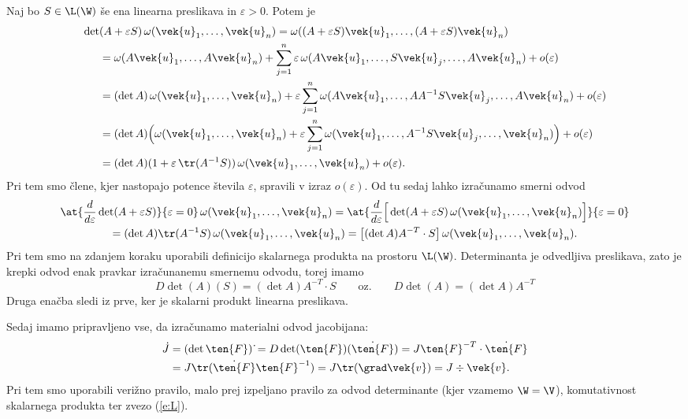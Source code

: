 Naj bo $S\in\L(\W)$ še ena linearna preslikava in $\varepsilon>0$. Potem je
\begin{align*}
	\det&(A+\varepsilon S)\,\omega(\vek{u}_1,\dots,\vek{u}_n)=
	\omega((A+\varepsilon S)\vek{u}_1,\dots,(A+\varepsilon S)\vek{u}_n)\\
	&=\omega(A\vek{u}_1,\dots,A\vek{u}_n)+
	\sum_{j=1}^n\varepsilon\,\omega(A\vek{u}_1,\dots,S\vek{u}_j,\dots,A\vek{u}_n)+o(\varepsilon)\\
	&=(\det A)\,\omega(\vek{u}_1,\dots,\vek{u}_n)+\varepsilon
	\sum_{j=1}^n\omega(A\vek{u}_1,\dots,AA^{-1}S\vek{u}_j,\dots,A\vek{u}_n)+o(\varepsilon)\\
	&=(\det A)\Big(\omega(\vek{u}_1,\dots,\vek{u}_n)+\varepsilon
	\sum_{j=1}^n\omega(\vek{u}_1,\dots,A^{-1}S\vek{u}_j,\dots,\vek{u}_n)\Big)+o(\varepsilon)\\
	&=(\det A)(1+\varepsilon\,\tr(A^{-1}S))\,\omega(\vek{u}_1,\dots,\vek{u}_n)+o(\varepsilon).
\end{align*}
Pri tem smo člene, kjer nastopajo potence števila $\varepsilon$, spravili
v izraz $o(\varepsilon)$. Od tu sedaj lahko izračunamo smerni odvod
\begin{multline*}
	\at{\frac{d}{d\varepsilon}\det(A+\varepsilon S)}{\varepsilon=0}
	\,\omega(\vek{u}_1,\dots,\vek{u}_n)=
	\at{\frac{d}{d\varepsilon}\Big[\det(A+\varepsilon S)
	\,\omega(\vek{u}_1,\dots,\vek{u}_n)\Big]}{\varepsilon=0}\\
	=(\det A)\tr(A^{-1}S)\,\omega(\vek{u}_1,\dots,\vek{u}_n)=
	\big[(\det A)A^{-T}\cdot S\big]\,\omega(\vek{u}_1,\dots,\vek{u}_n).
\end{multline*}
Pri tem smo na zdanjem koraku uporabili definicijo skalarnega produkta na prostoru $\L(\W)$.
Determinanta je odvedljiva preslikava, zato je krepki odvod enak pravkar izračunanemu
smernemu odvodu, torej imamo
\[
	D\det(A)(S)=(\det A)A^{-T}\cdot S\qquad\textrm{oz.}\qquad D\det(A)=(\det A)A^{-T}
\]
Druga enačba sledi iz prve, ker je skalarni produkt linearna preslikava.

Sedaj imamo pripravljeno vse, da izračunamo materialni odvod jacobijana:
\begin{align}
	\dot{J}&=(\det\ten{F})\,\dot{}=D\det(\ten{F})(\dot{\ten{F}})=J\ten{F}^{-T}\cdot\dot{\ten{F}}
	\nonumber \\ &= J\tr(\dot{\ten{F}}\ten{F}^{-1}) = J\tr(\grad\vek{v})=J\div\vek{v}. \label{e:dotJ}
\end{align}
Pri tem smo uporabili verižno pravilo, malo prej izpeljano pravilo za odvod determinante
(kjer vzamemo $\W=\V$), komutativnost skalarnega produkta ter zvezo (\ref{e:L}).

